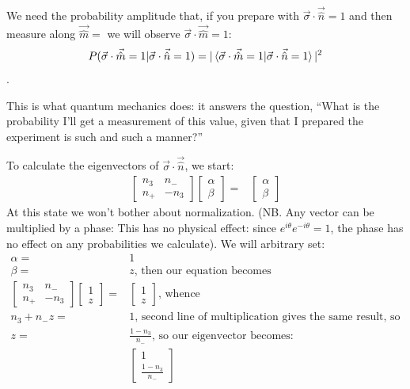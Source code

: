 \documentclass[]{article}
\begin{document}
We need the probability amplitude that, if you prepare with $\vec{\sigma} \cdot \vec{\hat{n}}=1$ and then measure along $\vec{\hat{m}}=$ we will observe $\vec{\sigma} \cdot \vec{\hat{m}}=1$:
$$P(\vec{\sigma} \cdot \vec{\hat{m}}=1\vert\vec{\sigma} \cdot \vec{\hat{n}}=1) = \vert \braket{\vec{\sigma} \cdot \vec{\hat{m}}=1\vert\vec{\sigma} \cdot \vec{\hat{n}}=1}\vert^2$$.

This is what quantum mechanics does: it answers the question, ``What is the probability I'll get a measurement of this value, given that I prepared the experiment is such and such a manner?''

To calculate the eigenvectors of $\vec{\sigma} \cdot \vec{\hat{n}}$, we start:
\begin{align*}
	\begin{bmatrix}
		n_3 &n_-\\
		n_+&-n_3
	\end{bmatrix}\begin{bmatrix}
		\alpha\\
		\beta
	\end{bmatrix}=&\begin{bmatrix}
		\alpha\\
		\beta
	\end{bmatrix}
\end{align*}
At this state we won't bother about normalization. (NB. Any vector can be multiplied by a phase: This has no physical effect: since $e^{i\theta}e^{-i\theta}=1$, the phase has no effect on any probabilities we calculate). We will arbitrary set: 
\begin{align*}
	\alpha=&1\\
	\beta=&z \text{, then our equation becomes}\\
	\begin{bmatrix}
		n_3 &n_-\\
		n_+&-n_3
	\end{bmatrix}\begin{bmatrix}
		1\\
		z
	\end{bmatrix}=&\begin{bmatrix}
		1\\
		z
	\end{bmatrix} \text{, whence}\\
	n_3 + n_- z =& 1 \text{, second line of multiplication gives the same result, so we'll ignore.}\\
	z =& \frac{1-n_3}{n_-} \text{, so our eigenvector becomes:}\\
	&\begin{bmatrix}
		1\\
		\frac{1-n_3}{n_-} 
	\end{bmatrix}
\end{align*}
\end{document}

